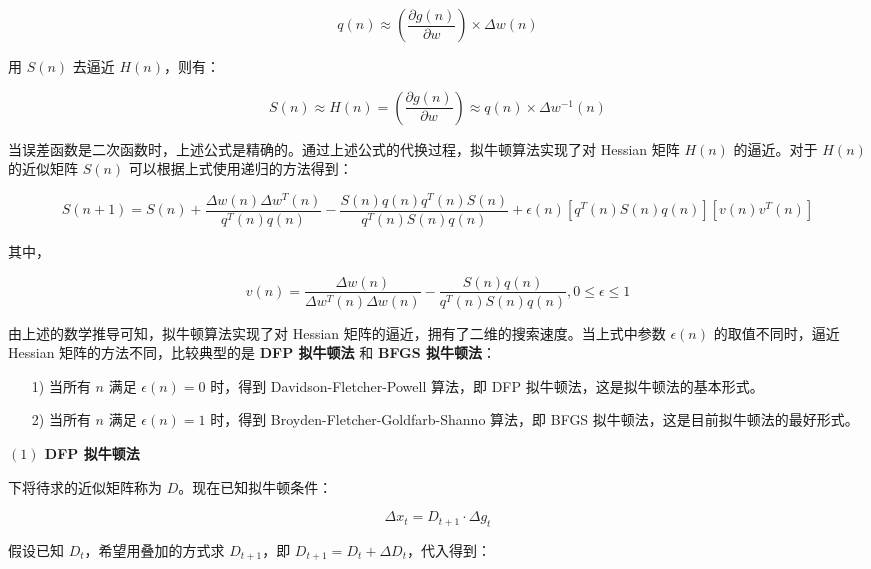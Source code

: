 \documentclass[UTF8]{ctexart}
\begin{document}
\begin{equation}
q(n) \approx (\frac{\partial g(n)}{\partial w}) \times \Delta w(n)
\end{equation}

用 $S(n)$ 去逼近 $H(n)$，则有：

\begin{equation}
S(n) \approx H(n) = (\frac{\partial g(n)}{\partial w}) \approx q(n) \times \Delta w^{-1}(n)
\end{equation}

当误差函数是二次函数时，上述公式是精确的。通过上述公式的代换过程，拟牛顿算法实现了对 Hessian 矩阵 $H(n)$ 的逼近。对于 $H(n)$ 的近似矩阵 $S(n)$ 可以根据上式使用递归的方法得到： \par

\begin{equation}
S(n+1) = S(n) + \frac{\Delta w(n) \Delta w^T(n)}{q^T(n) q(n)} - \frac{S(n) q(n) q^T(n) S(n)}{q^T(n) S(n) q(n)} + \epsilon(n)[q^T(n) S(n) q(n)][v(n)v^T(n)]
\end{equation}

其中，

\begin{equation}
v(n) = \frac{\Delta w(n)}{\Delta w^T(n) \Delta w(n)} - \frac{S(n)q(n)}{q^T(n)S(n)q(n)}, 0 \le \epsilon \le 1
\end{equation}

由上述的数学推导可知，拟牛顿算法实现了对 Hessian 矩阵的逼近，拥有了二维的搜索速度。当上式中参数 $\epsilon(n)$ 的取值不同时，逼近 Hessian 矩阵的方法不同，比较典型的是\textbf{ DFP 拟牛顿法} 和 \textbf{BFGS 拟牛顿法}：

\begin{itemize}
\item [1)] 当所有 $n$ 满足 $\epsilon(n) = 0$ 时，得到 Davidson-Fletcher-Powell 算法，即 DFP 拟牛顿法，这是拟牛顿法的基本形式。
\item [2)] 当所有 $n$ 满足 $\epsilon(n) = 1$ 时，得到 Broyden-Fletcher-Goldfarb-Shanno 算法，即 BFGS 拟牛顿法，这是目前拟牛顿法的最好形式。
\end{itemize}

\textbf{$(1)$ DFP 拟牛顿法} \par

下将待求的近似矩阵称为 $D$。现在已知拟牛顿条件：

\begin{equation}
\Delta x_t=D_{t+1}\cdot \Delta g_t
\end{equation}

假设已知 $D_t$，希望用叠加的方式求 $D_{t+1}$，即 $D_{t+1}=D_{t}+\Delta D_t$，代入得到：\par
\end{document}
